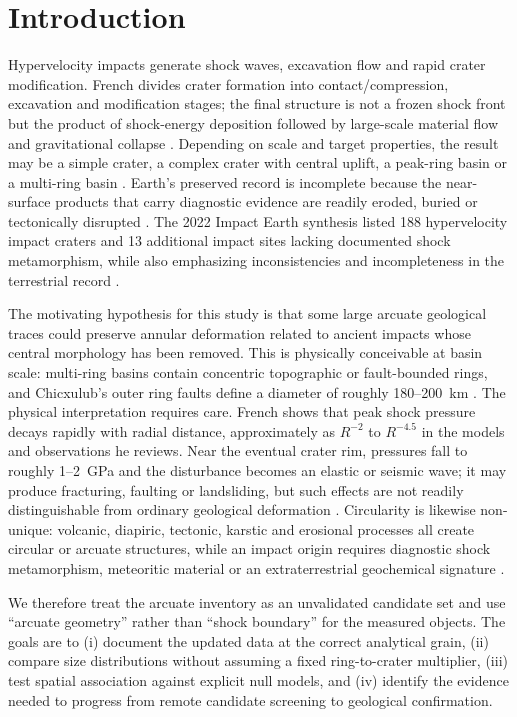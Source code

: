 \documentclass[11pt]{article}
\begin{document}
\section{Introduction}
Hypervelocity impacts generate shock waves, excavation flow and rapid crater modification. French divides crater formation into contact/compression, excavation and modification stages; the final structure is not a frozen shock front but the product of shock-energy deposition followed by large-scale material flow and gravitational collapse \cite[pp.~17--29]{French1998}. Depending on scale and target properties, the result may be a simple crater, a complex crater with central uplift, a peak-ring basin or a multi-ring basin \cite{French1998,Osinski2022}. Earth's preserved record is incomplete because the near-surface products that carry diagnostic evidence are readily eroded, buried or tectonically disrupted \cite[pp.~28--30]{French1998,Osinski2022}. The 2022 Impact Earth synthesis listed 188 hypervelocity impact craters and 13 additional impact sites lacking documented shock metamorphism, while also emphasizing inconsistencies and incompleteness in the terrestrial record \cite{Osinski2022}.

The motivating hypothesis for this study is that some large arcuate geological traces could preserve annular deformation related to ancient impacts whose central morphology has been removed. This is physically conceivable at basin scale: multi-ring basins contain concentric topographic or fault-bounded rings, and Chicxulub's outer ring faults define a diameter of roughly 180--200~km \cite{French1998,Gulick2013}. The physical interpretation requires care. French shows that peak shock pressure decays rapidly with radial distance, approximately as $R^{-2}$ to $R^{-4.5}$ in the models and observations he reviews. Near the eventual crater rim, pressures fall to roughly 1--2~GPa and the disturbance becomes an elastic or seismic wave; it may produce fracturing, faulting or landsliding, but such effects are not readily distinguishable from ordinary geological deformation \cite[pp.~18--19]{French1998}. Circularity is likewise non-unique: volcanic, diapiric, tectonic, karstic and erosional processes all create circular or arcuate structures, while an impact origin requires diagnostic shock metamorphism, meteoritic material or an extraterrestrial geochemical signature \cite[pp.~97--100]{French1998,FrenchKoeberl2010,Osinski2022}.

We therefore treat the arcuate inventory as an unvalidated candidate set and use ``arcuate geometry'' rather than ``shock boundary'' for the measured objects. The goals are to (i) document the updated data at the correct analytical grain, (ii) compare size distributions without assuming a fixed ring-to-crater multiplier, (iii) test spatial association against explicit null models, and (iv) identify the evidence needed to progress from remote candidate screening to geological confirmation.
\end{document}
